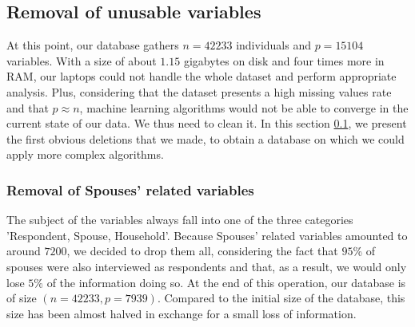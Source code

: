 \documentclass[]{article}
\begin{document}
\subsection{Removal of unusable variables}
\label{removal_of_unusable_variables}
At this point, our database gathers $n=42233$ individuals and $p=15104$ variables. With a size of about $1.15$ gigabytes on disk and four times more in RAM, our laptops could not handle the whole dataset and perform appropriate analysis. Plus, considering that the dataset presents a high missing values rate and that $p\approx n$, machine learning algorithms would not be able to converge in the current state of our data. We thus need to clean it. In this section \ref{removal_of_unusable_variables}, we present the first obvious deletions that we made, to obtain a database on which we could apply more complex algorithms.

\subsubsection{Removal of Spouses' related variables}
The subject of the variables always fall into one of the three categories 'Respondent, Spouse, Household'. Because Spouses' related variables amounted to around $7200$, we decided to drop them all, considering the fact that $95$\% of spouses were also interviewed as respondents and that, as a result, we would only lose $5\%$ of the information doing so.
At the end of this operation, our database is of size $(n=42233, p=7939)$. Compared to the initial size of the database, this size has been almost halved in exchange for a small loss of information.
\end{document}
